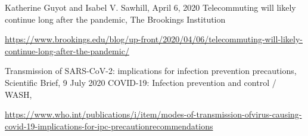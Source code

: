 \begin{multicols}{2}
\begin{thebibliography}{99}
 Katherine Guyot and Isabel V. Sawhill, April 6, 2020 Telecommuting will likely continue long after the pandemic, The Brookings Institution

\url{https://www.brookings.edu/blog/up-front/2020/04/06/telecommuting-will-likely-continue-long-after-the-pandemic/}

 Transmission of SARS-CoV-2: implications for infection prevention precautions, Scientific Brief, 9 July 2020 COVID-19: Infection prevention and control / WASH,

\url{https://www.who.int/publications/i/item/modes-of-transmission-ofvirus-causing-covid-19-implications-for-ipc-precautionrecommendations}

\end{thebibliography}

\end{multicols}


